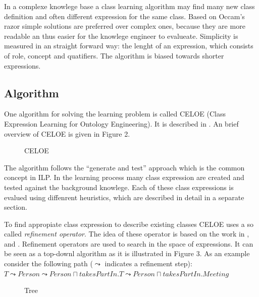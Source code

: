 In a complexe knowlege base a class learning algorithm may find many new class
definition and often different expression for the same class. Based on Occam's
razor \cite{occam-razor} simple solutions are preferred over complex ones,
because they are more readable an thus easier for the knowlege engineer to
evalueate. Simplicity is measured in an straight forward way: the lenght of an
expression, which consists of role, concept and quatifiers.
The algorithm is biased towards shorter expressions. \cite{paper1}

\subsection*{Algorithm}
One algorithm for solving the learning problem is called CELOE (Class
Expression Learning for Ontology Engineering). It is described in \cite{paper1}.
An brief overview of CELOE is given in Figure 2.
\begin{figure}
\label{celoe}
\centering
{}
\caption{CELOE\cite{paper1}}
\end{figure}
The algorithm follows the ``generate and test'' approach which is the common
concept in ILP. 
In the learning process many class expression are created and tested against the
background knowlege. Each of these class expressions is evalued using diffenrent
heuristics, which are described in detail in a separate section.

To find appropiate class expression to describe existing classes CELOE uses a so
called \emph{refinement operator}. The idea of these operator is based on the
work in \cite{refinement1},\cite{refinement2} and \cite{refinement3}. Refinement
operators are used to search in the space of expressions. It can be seen as a
top-downl algorithm as it is illustrated in Figure 3.
As an example consider the following path ($\leadsto$ indicates a refinement
step):\vspace{6pt}\\
$T \leadsto Person \leadsto Person \sqcap takesPartIn.T \leadsto Person \sqcap
takesPartIn.Meeting$

\begin{figure}
\label{tree}
\centering
{}
\caption{Tree\cite{paper1}}
\end{figure}

